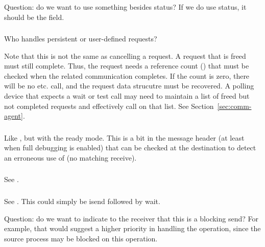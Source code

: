 \documentclass{article}
\begin{document}
Question: do we want to use something besides status?  If we do use
status, it should be the  field.

\subsubsection{}
\begin{adi3}
\end{adi3}
Who handles persistent or user-defined requests?

Note that this is not the same as cancelling a request.  
A request that is freed must still complete.  Thus, the request needs
a reference count () that must be
checked when the related communication 
completes.  If the count is zero, there will be no 
etc. call, and the request data strucutre must be recovered.  A
polling device that expects a wait or test call may need to maintain a
list of freed but not completed requests and effectively call
 on that list.  See Section~\ref{sec:comm-agent}.

\subsubsection{}
Like , but with the ready mode.  This is a bit in
the message header (at least when full debugging is enabled) that can
be checked at the destination to detect an erroneous use of
 (no matching receive).

\subsubsection{}
See .

\subsubsection{}
See .  This could simply be isend followed by wait.

Question: do we want to indicate to the receiver that this is a
blocking send?  For example, that would suggest a higher priority in
handling the operation, since the source process may be blocked on
this operation.
\end{document}

